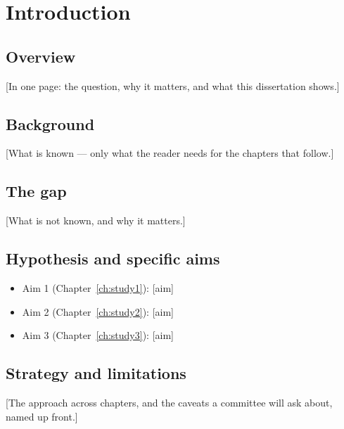 \chapter{Introduction}
\label{ch:intro}

\section{Overview}
\label{sec:overview}
[In one page: the question, why it matters, and what this dissertation shows.]

\section{Background}
\label{sec:background}
[What is known — only what the reader needs for the chapters that follow.]

\section{The gap}
\label{sec:gap}
[What is not known, and why it matters.]

\section{Hypothesis and specific aims}
\label{sec:aims}
\begin{itemize}
  \item Aim 1 (Chapter~\ref{ch:study1}): [aim]
  \item Aim 2 (Chapter~\ref{ch:study2}): [aim]
  \item Aim 3 (Chapter~\ref{ch:study3}): [aim]
\end{itemize}

\section{Strategy and limitations}
\label{sec:strategy}
[The approach across chapters, and the caveats a committee will ask about, named up front.]
